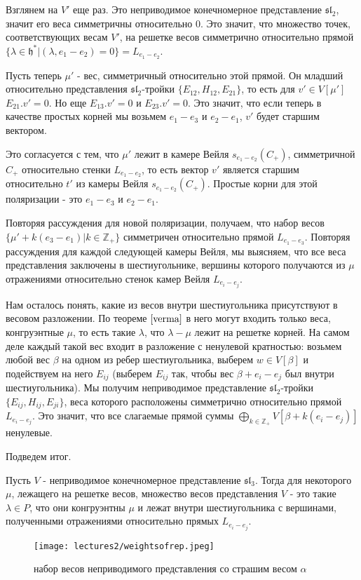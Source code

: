 \documentclass[a4article]{article}
\begin{document}
Взглянем на $V'$ еще раз. Это неприводимое конечномерное представление $\mathfrak{sl}_2$, значит его веса симметричны относительно 0. Это значит, что множество точек, соответствующих весам $V'$, на решетке весов симметрично относительно прямой $\{\lambda \in \mathfrak{h}^*|(\lambda, e_1-e_2)=0\}=L_{e_1-e_2}$. 

Пусть теперь $\mu'$ - вес, симметричный относительно этой прямой. Он младший относительно представления $\mathfrak{sl}_2$-тройки $\{E_{12}, H_{12}, E_{21}\}$, то есть для 
$v' \in V[\mu']$ $E_{21}.v' = 0$. Но еще $E_{13}.v' = 0$ и $E_{23}.v' = 0$. Это значит, что если теперь в качестве простых корней мы возьмем $e_1 - e_3$ и $e_2 - e_1$, $v'$ будет старшим вектором.
\begin{remark}
    Это согласуется с тем, что $\mu'$ лежит в камере Вейля $s_{e_1-e_2}(C_+)$, симметричной $C_+$ относительно стенки $L_{e_1-e_2}$, то есть вектор $v'$ является старшим относительно $t'$ из камеры Вейля $s_{e_1-e_2}(C_+)$. Простые корни для этой поляризации - это $e_1 - e_3$ и $e_2 - e_1$.
\end{remark}

Повторяя рассуждения для новой поляризации, получаем, что набор весов $\{\mu' + k(e_3-e_1)|k\in \mathbb{Z}_+\}$ симметричен относительно прямой $L_{e_1-e_3}$. Повторяя рассуждения для каждой следующей камеры Вейля, мы выясняем, что все веса представления заключены в шестиугольнике, вершины которого получаются из $\mu$ отражениями относительно стенок камер Вейля $L_{e_i - e_j}$.

Нам осталось понять, какие из весов внутри шестиугольника присутствуют в весовом разложении. По теореме $\ref{verma}$ в него могут входить только веса, конгруэнтные $\mu$, то есть такие $\lambda$, что $\lambda - \mu$ лежит на решетке корней. На самом деле каждый такой вес входит в разложение с ненулевой кратностью: возьмем любой вес $\beta$ на одном из ребер шестиугольника, выберем $w \in V[\beta]$ и подействуем на него $E_{ij}$ (выберем $E_{ij}$ так, чтобы вес $\beta + e_i - e_j$ был внутри шестиугольника). Мы получим неприводимое представление $\mathfrak{sl}_2$-тройки $\{E_{ij}, H_{ij}, E_{ji}\}$, веса которого расположены симметрично относительно прямой $L_{e_i-e_j}$. Это значит, что все слагаемые прямой суммы $\bigoplus_{k \in \mathbb{Z}_+}V[\beta + k(e_i-e_j)]$ ненулевые.

Подведем итог.
\begin{theorem}
    Пусть $V$ - неприводимое конечномерное представление $\mathfrak{sl}_3$. Тогда для некоторого $\mu$, лежащего на решетке весов, множество весов представления $V$ - это такие $\lambda \in P$, что они конгруэнтны $\mu$ и лежат внутри шестиугольника с вершинами, полученными отражениями относительно прямых $L_{e_i-e_j}$.
\end{theorem}
\begin{example}
    \begin{figure}[h!]
    \centering
    \texttt{[image: lectures2/weightsofrep.jpeg]}
    \caption{набор весов неприводимого представления со страшим весом $\alpha$}
    \label{fig:enter-label}
    \end{figure}
\end{example}
\end{document}
